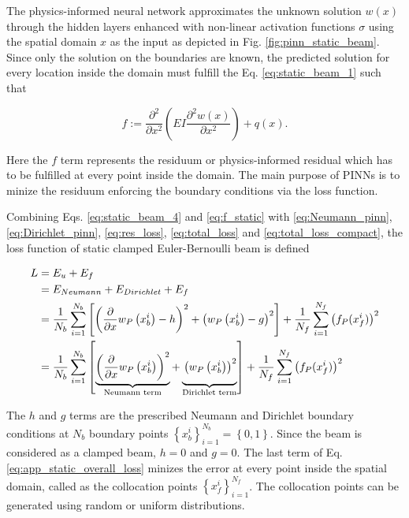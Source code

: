 The physics-informed neural network approximates the unknown solution $w(x)$
through the hidden layers enhanced with non-linear activation functions $\sigma$ using the spatial domain $x$ as the input 
as depicted in Fig. \ref{fig:pinn_static_beam}.
Since only the solution on the boundaries are known, the predicted solution for every location inside the domain must fulfill
the Eq. \ref{eq:static_beam_1} such that 

\begin{equation}
    \label{eq:f_static}
    f:=\frac{\partial^{2}}{\partial x^{2}}\left(E I \frac{\partial^{2} w(x)}{\partial x^{2}}\right)+q(x).
\end{equation}

Here the $f$ term represents the residuum or physics-informed residual which has to be fulfilled at every point inside
the domain. The main purpose of PINNs is to minize the residuum enforcing the boundary conditions via the loss function.

Combining Eqs. \ref{eq:static_beam_4} and \ref{eq:f_static} with \ref{eq:Neumann_pinn}, 
\ref{eq:Dirichlet_pinn}, \ref{eq:res_loss}, \ref{eq:total_loss} and \ref{eq:total_loss_compact}, the loss function of 
static clamped Euler-Bernoulli beam is defined

\begin{equation}
    \label{eq:app_static_overall_loss}
    \begin{aligned}
        L & = E_{u} +  E_{f} \\ 
          & = E_{Neumann} + E_{Dirichlet} + E_{f} \\ 
          & = \frac{1}{N_{b}} \sum_{i=1}^{N_{b}}\left[\left(\frac{\partial}{\partial x} w_{P}\left(x_{b}^{i}\right)-h\right)^{2} +
          \left( w_{P}\left(x_{b}^{i}\right)-g\right)^{2} \right] + 
          \frac{1}{N_{f}} \sum_{i=1}^{N_{f}}\left(f_{P} (x_{f}^{i})\right)^{2} \\
          & = \frac{1}{N_{b}} \sum_{i=1}^{N_{b}}\left[\underbrace{\left(\frac{\partial}{\partial x} w_{P}\left(x_{b}^{i}\right)\right)^{2}}_{\text{Neumann term}} +
          \underbrace{ \vphantom{\left(\frac{\partial}{\partial x}\right)} \left( w_{P}\left(x_{b}^{i}\right)\right)^{2}}_{\text{Dirichlet term}} \right] + 
          \frac{1}{N_{f}} \sum_{i=1}^{N_{f}}\left(f_{P} (x_{f}^{i})\right)^{2}
    \end{aligned}
\end{equation}

\noindent The $h$ and $g$ terms
are the prescribed Neumann and Dirichlet boundary conditions at $N_{b}$ 
boundary points $\left\{x_{b}^{i}\right\}_{i=1}^{N_{b}} = \left\{0,1\right\}$. 
Since the beam is considered as a clamped beam, $h=0$ and $g=0$.  
The last term of Eq. \ref{eq:app_static_overall_loss} minizes the error at every point inside the spatial domain,
called as the collocation 
points $\left\{x_{f}^{i}\right\}_{i=1}^{N_{f}}$. The collocation points can be generated using random or uniform distributions.

